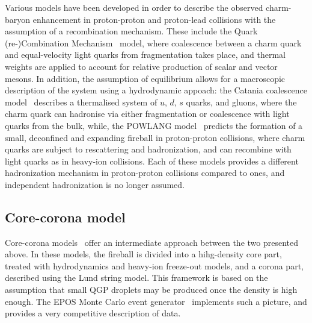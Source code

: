 Various models have been developed in order to describe the observed charm-baryon enhancement in proton-proton and proton-lead collisions with the assumption of a recombination mechanism. These include the Quark (re-)Combination Mechanism~\cite{Song:2018tpv} model, where coalescence between a charm quark and equal-velocity light quarks from fragmentation takes place, and thermal weights are applied to account for relative production of scalar and vector mesons. In addition, the assumption of equilibrium allows for a macroscopic description of the system using a hydrodynamic appoach: the Catania coalescence model~\cite{Minissale:2020bif} describes a thermalised system of $u$, $d$, $s$ quarks, and gluons, where the charm quark can hadronise via either fragmentation or coalescence with light quarks from the bulk, while, the POWLANG model~\cite{Beraudo:2023nlq} predicts the formation of a small, deconfined and expanding fireball in proton-proton collisions, where charm quarks are subject to rescattering and hadronization, and can recombine with light quarks as in heavy-ion collisions. Each of these models provides a different hadronization mechanism in proton-proton collisions compared to \ee ones, and independent hadronization is no longer assumed. 

\subsection{Core-corona model}
Core-corona models~\cite{Werner:2007bf} offer an intermediate approach between the two presented above. In these models, the fireball is divided into a hihg-density core part, treated with hydrodynamics and heavy-ion freeze-out models, and a corona part, described using the Lund string model. This framework is based on the assumption that small QGP droplets may be produced once the density is high enough. The EPOS Monte Carlo event generator~\cite{Porteboeuf:2008fgf} implements such a picture, and provides a very competitive description of data.

